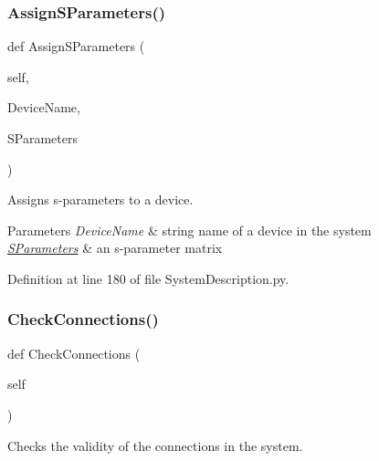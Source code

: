 \subsubsection{\texorpdfstring{Assign\+S\+Parameters()}{AssignSParameters()}}
{\footnotesize\ttfamily def Assign\+S\+Parameters (\begin{DoxyParamCaption}\item[{}]{self,  }\item[{}]{Device\+Name,  }\item[{}]{S\+Parameters }\end{DoxyParamCaption})}



Assigns s-\/parameters to a device. 


\begin{DoxyParams}{Parameters}
{\em Device\+Name} & string name of a device in the system \\
\hline
{\em \hyperlink{namespaceSignalIntegrity_1_1SParameters}{S\+Parameters}} & an s-\/parameter matrix \\
\hline
\end{DoxyParams}


Definition at line 180 of file System\+Description.\+py.

\mbox{\label{classSignalIntegrity_1_1SystemDescriptions_1_1SystemDescription_1_1SystemDescription_abc6647e2004523ee8d9b8c2bece038a3}} 
\subsubsection{\texorpdfstring{Check\+Connections()}{CheckConnections()}}
{\footnotesize\ttfamily def Check\+Connections (\begin{DoxyParamCaption}\item[{}]{self }\end{DoxyParamCaption})}



Checks the validity of the connections in the system. 


